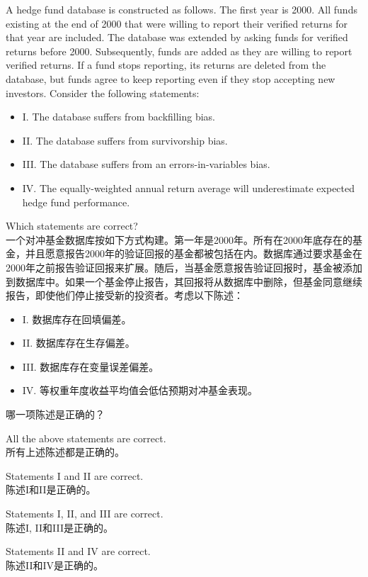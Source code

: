 \documentclass{article}
\newcounter{question} %
\begin{document}
\begin{question}
    A hedge fund database is constructed as follows. The first year is 2000. All funds existing at the end of 2000 that were willing to report their verified returns for that year are included. The database was extended by asking funds for verified returns before 2000. Subsequently, funds are added as they are willing to report verified returns. If a fund stops reporting, its returns are deleted from the database, but funds agree to keep reporting even if they stop accepting new investors. Consider the following statements:  
    \begin{itemize}
        \item I. The database suffers from backfilling bias.  
        \item II. The database suffers from survivorship bias.  
        \item III. The database suffers from an errors-in-variables bias.  
        \item IV. The equally-weighted annual return average will underestimate expected hedge fund performance.  
    \end{itemize}
    Which statements are correct?
    \\一个对冲基金数据库按如下方式构建。第一年是2000年。所有在2000年底存在的基金，并且愿意报告2000年的验证回报的基金都被包括在内。数据库通过要求基金在2000年之前报告验证回报来扩展。随后，当基金愿意报告验证回报时，基金被添加到数据库中。如果一个基金停止报告，其回报将从数据库中删除，但基金同意继续报告，即使他们停止接受新的投资者。考虑以下陈述：
    \begin{itemize}
        \item I. 数据库存在回填偏差。
        \item II. 数据库存在生存偏差。
        \item III. 数据库存在变量误差偏差。
        \item IV. 等权重年度收益平均值会低估预期对冲基金表现。
    \end{itemize}
    哪一项陈述是正确的？
\end{question}

\begin{choices}
    \item All the above statements are correct.\\所有上述陈述都是正确的。
    \item Statements I and II are correct.\\陈述I和II是正确的。
    \item Statements I, II, and III are correct.\\陈述I, II和III是正确的。
    \item Statements II and IV are correct.\\陈述II和IV是正确的。
\end{choices}
\end{document}
